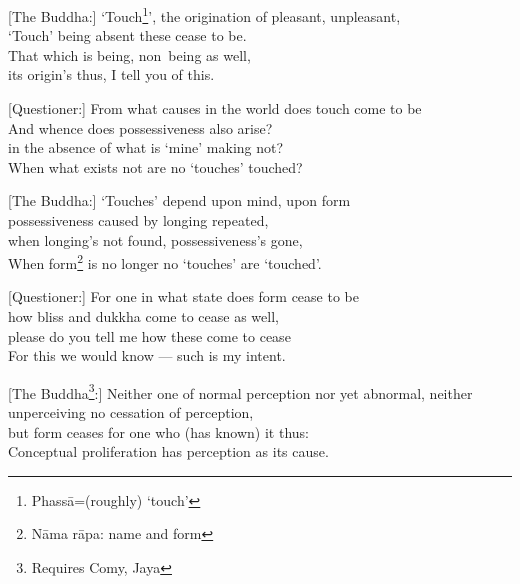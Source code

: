 \begin{MyDescription}{}[The Buddha:]
`Touch\footnote{Phass\=a=(roughly) `touch'}', the origination of pleasant, unpleasant,\\
`Touch' being absent these cease to be.\\
That which is being, non~being as well,\\
its origin's thus, I tell you of this.
\end{MyDescription}

\begin{MyDescription}{}[Questioner:]
From what causes in the world does touch come to be\\
And whence does possessiveness also arise?\\
in the absence of what is `mine' making not?\\
When what exists not are no `touches' touched?
\end{MyDescription}

\begin{MyDescription}{}[The Buddha:]
`Touches' depend upon mind, upon form\\
possessiveness caused by longing repeated,\\
when longing's not found, possessiveness's gone,\\
When form\footnote{N\=ama r\=apa: name and form} is no longer no `touches' are `touched'.
\end{MyDescription}

\begin{MyDescription}{}[Questioner:]
For one in what state does form cease to be\\
how bliss and dukkha come to cease as well,\\
please do you tell me how these come to cease\\
For this we would know — such is my intent.
\end{MyDescription}

\begin{MyDescription}{}[The Buddha\footnote{Requires Comy, Jaya}:]
Neither one of normal perception nor yet abnormal,
neither unperceiving no cessation of perception,\\
but form ceases for one who (has known) it thus:\\
Conceptual proliferation has perception as its cause.
\end{MyDescription}

